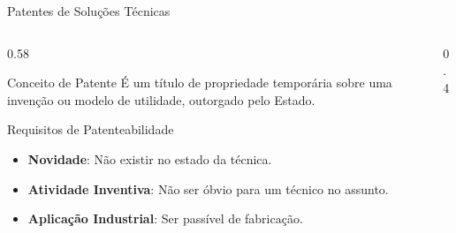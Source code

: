 \documentclass[9pt]{beamer}
\begin{document}
\begin{frame}{Patentes de Soluções Técnicas}
  \begin{columns}[T]
    \begin{column}{0.58\textwidth}
      \begin{block}{Conceito de Patente}
        \small
        É um título de propriedade temporária sobre uma invenção ou modelo de utilidade, outorgado pelo Estado.
      \end{block}
      \begin{block}{Requisitos de Patenteabilidade}
        \small
        \begin{itemize}
          \item \textbf{Novidade}: Não existir no estado da técnica.
          \item \textbf{Atividade Inventiva}: Não ser óbvio para um técnico no assunto.
          \item \textbf{Aplicação Industrial}: Ser passível de fabricação.
        \end{itemize}
      \end{block}
    \end{column}
    
    \begin{column}{0.4\textwidth}
      \vspace{0.5cm}
      \begin{center}
      \end{center}
    \end{column}
  \end{columns}
\end{frame}
\end{document}
